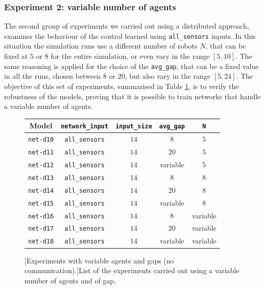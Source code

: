\subsubsection{Experiment 2: variable number of agents}
\label{subsubsec:task1-exp-distr-2}
The second group of experiments we carried out using a distributed approach, 
examines the behaviour of the control learned using \texttt{all\_sensors} inputs. 
In this situation the simulation runs use a different number of robots $N$, that 
can be fixed at $5$ or $8$ for the entire simulation, or even vary in the range $[5, 
10]$. The same reasoning is applied for the choice of the \texttt{avg\_gap}, that 
can be a fixed value in all the runs, chosen between $8$ or $20$, but also vary in 
the range $[5, 24]$. 
The objective of this set of experiments, summarised in Table \ref{tab:modeldist}, 
is to verify the robustness of the models, proving that it is possible to train 
networks that handle a variable number of agents. 
\begin{figure}[H]
	\centering
	\begin{tabular}{ccccc}
		\toprule
		\textbf{Model} \quad & \textbf{\texttt{network\_input}} & 
		\textbf{\texttt{input\_size}} & \textbf{\texttt{avg\_gap}} & \textbf{\texttt{N}}\\
		\midrule
		\texttt{net-d10} 	& \texttt{all\_sensors}		&  $14$  &  $8$		 	 &	$5$ \\
		\texttt{net-d11} 	& \texttt{all\_sensors}		&  $14$  &  $20$		&	$5$ \\
		\texttt{net-d12} 	& \texttt{all\_sensors}		&  $14$  &  variable   &	$5$ \\
		\texttt{net-d13} 	& \texttt{all\_sensors}	  	&  $14$  &  $8$			 &	  $8$ \\
		\texttt{net-d14} 	& \texttt{all\_sensors}	  	&  $14$  &  $20$   		&	 $8$ \\
		\texttt{net-d15} 	& \texttt{all\_sensors}	  	&  $14$  &  variable	&	 $8$ \\
		\texttt{net-d16} 	& \texttt{all\_sensors}	  	&  $14$  &  $ 8$		  &	 variable\\
		\texttt{net-d17} 	& \texttt{all\_sensors}	  	&  $14$  &  $20$		 &	variable\\
		\texttt{net-d18} 	& \texttt{all\_sensors}	  	&  $14$  &  variable	 &	
		variable\\
		\bottomrule
	\end{tabular}
	[Experiments with variable agents and gaps (no 
	communication).]{List of the experiments carried out using a variable 
	number of agents and of gap.}
	\label{tab:modeldist}
\end{figure}

